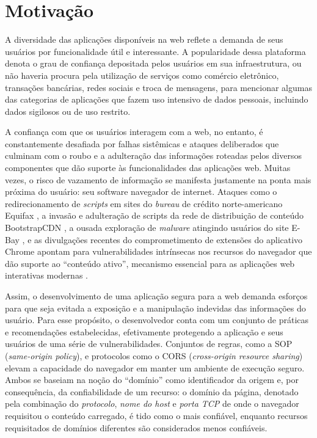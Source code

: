 \section{Motivação}

A diversidade das aplicações disponíveis na web reflete a demanda de seus usuários por funcionalidade útil e interessante. A popularidade dessa plataforma denota o grau de confiança depositada pelos usuários em sua infraestrutura, ou não haveria procura pela utilização de serviços como comércio eletrônico, transações bancárias, redes sociais e troca de mensagens, para mencionar algumas das categorias de aplicações que fazem uso intensivo de dados pessoais, incluindo dados sigilosos ou de uso restrito.

A confiança com que os usuários interagem com a web, no entanto, é constantemente desafiada por falhas sistêmicas e ataques deliberados que culminam com o roubo e a adulteração das informações roteadas pelos diversos componentes que dão suporte às funcionalidades das aplicações web. Muitas vezes, o risco de vazamento de informação se manifesta justamente na ponta mais próxima do usuário: seu software navegador de internet. Ataques como o redirecionamento de \textit{scripts} em sites do \textit{bureau} de crédito norte-americano Equifax \cite{Segura2017}, a invasão e adulteração de scripts da rede de distribuição de conteúdo BootstrapCDN \cite{Dorfman2013}, a ousada exploração de \textit{malware} atingindo usuários do site E-Bay \cite{Vanunu2016}, e as divulgações recentes do comprometimento de extensões do aplicativo Chrome \cite{Forrest2017} apontam para vulnerabilidades intrínsecas nos recursos do navegador que dão suporte ao ``conteúdo ativo'', mecanismo essencial para as aplicações web interativas modernas \cite{Hedin2016}.

Assim, o desenvolvimento de uma aplicação segura para a web demanda esforços para que seja evitada a exposição e a manipulação indevidas das informações do usuário. Para esse propósito, o desenvolvedor conta com um conjunto de práticas e recomendações estabelecidas, efetivamente protegendo a aplicação e seus usuários de uma série de vulnerabilidades. Conjuntos de regras, como a SOP (\textit{same-origin policy}), e protocolos como o CORS (\textit{cross-origin resource sharing}) elevam a capacidade do navegador em manter um ambiente de execução seguro. Ambos se baseiam na noção do ``domínio'' como identificador da origem e, por consequência, da confiabilidade de um recurso: o domínio da página, denotado pela combinação do \textit{protocolo}, \textit{nome do host} e \textit{porta TCP} de onde o navegador requisitou o conteúdo carregado, é tido como o mais confiável, enquanto recursos requisitados de domínios diferentes são considerados menos confiáveis.

